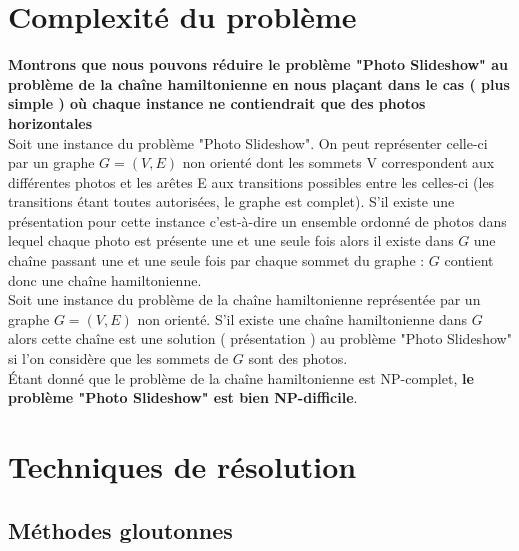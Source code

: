 \documentclass[12pt,a4paper]{article}
\begin{document}
\vspace{1\baselineskip}

\section{Complexité du problème}

\vspace{1\baselineskip}

\noindent \textbf{Montrons que nous pouvons réduire le problème "Photo Slideshow"  au problème de la chaîne hamiltonienne en nous plaçant dans le cas ( plus simple ) où chaque instance ne contiendrait que des photos horizontales}
\vspace{.5\baselineskip}\\
Soit une instance du problème "Photo Slideshow". On peut représenter celle-ci par un graphe $G = (V,E)$ non orienté dont les sommets V correspondent aux différentes photos et les arêtes E aux transitions possibles entre les celles-ci (les transitions étant toutes autorisées, le graphe est complet). S'il existe une présentation pour cette instance c'est-à-dire un ensemble ordonné de photos dans lequel chaque photo est présente une et une seule fois alors il existe dans $G$ une chaîne passant une et une seule fois par chaque sommet du graphe : $G$ contient donc une chaîne hamiltonienne.
\vspace{.5\baselineskip}\\
Soit une instance du problème de la chaîne hamiltonienne représentée par un graphe $G = (V,E)$ non orienté. S'il existe une chaîne hamiltonienne dans $G$ alors cette chaîne est une solution ( présentation ) au problème "Photo Slideshow" si l'on considère que les sommets de $G$ sont des photos.
\vspace{1\baselineskip}\\
Étant donné que le problème de la chaîne hamiltonienne est NP-complet, \textbf{le problème "Photo Slideshow" est bien NP-difficile}.

\vspace{.5\baselineskip}

\section{Techniques de résolution}

\vspace{1\baselineskip}

\subsection{Méthodes gloutonnes}
\end{document}
